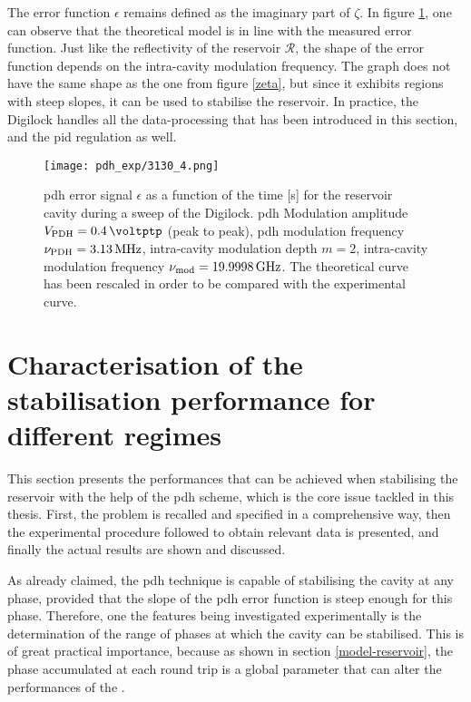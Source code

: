 The error function $\epsilon$ remains defined as the imaginary part of $\zeta$. In figure \ref{pdh_exp}, one can observe that the theoretical model is in line with the measured error function. Just like the reflectivity of the reservoir $\mathcal{R}$, the shape of the \pdh error function depends on the intra-cavity modulation frequency. The graph does not have the same shape as the one from figure \ref{zeta}, but since it exhibits regions with steep slopes, it can be used to stabilise the reservoir. In practice, the Digilock handles all the data-processing that has been introduced in this section, and the \gls{pid} regulation as well.

\begin{figure}
	\centering
	\texttt{[image: pdh\_exp/3130\_4.png]}
	\caption{\gls{pdh} error signal $\epsilon$ as a function of the time [s] for the reservoir cavity during a sweep of the Digilock. \gls{pdh} Modulation amplitude $\tind{V}{PDH}= \SI{0.4}{\voltptp}$ (peak to peak), \gls{pdh} modulation frequency $\nu_{\text{PDH}} = \SI{3.13}{\mega\hertz}$, intra-cavity modulation depth $m=2$, intra-cavity modulation frequency $\nu_{\text{mod}} = \SI{19.9998}{\giga\hertz}$. The theoretical curve has been rescaled in order to be compared with the experimental curve.}
	\label{pdh_exp}
\end{figure}


\section{Characterisation of the stabilisation performance for different regimes}

This section presents the performances that can be achieved when stabilising the reservoir with the help of the \gls{pdh} scheme, which is the core issue tackled in this thesis. First, the problem is recalled and specified in a comprehensive way, then the experimental procedure followed to obtain relevant data is presented, and finally the actual results are shown and discussed.

As already claimed, the \gls{pdh} technique is capable of stabilising the cavity at any phase, provided that the slope of the \gls{pdh} error function is steep enough for this phase. Therefore, one the features being investigated experimentally is the determination of the range of phases at which the cavity can be stabilised. This is of great practical importance, because as shown in section \ref{model-reservoir}, the phase accumulated at each round trip is a global parameter that can alter the performances of the \rcer.\\

